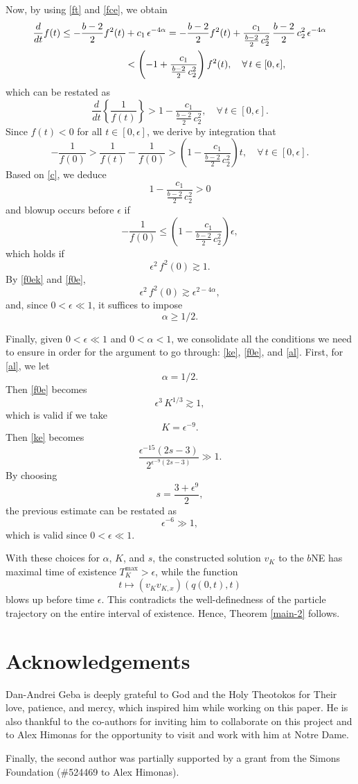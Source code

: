 \documentclass{amsart}
\begin{document}
Now, by using \eqref{ft} and \eqref{fce}, we obtain
\begin{equation*}
\aligned
\frac{d}{dt}f(t)\leq -\frac{b-2}{2}f^2(t) &+c_1\,\epsilon^{-4\alpha}= -\frac{b-2}{2}f^2(t)+\frac{c_1}{\frac{b-2}{2}\,c_2^2} \,\frac{b-2}{2}\,c_2^2\,\epsilon^{-4\alpha}\\
&<\left(-1+\frac{c_1}{\frac{b-2}{2}\,c_2^2}\right) f^2(t), \quad \forall\,t\in [0,\epsilon],
\endaligned
\end{equation*}
which can be restated as
\[
\frac{d}{dt}\left\{\frac{1}{f(t)}\right\}>1-\frac{c_1}{\frac{b-2}{2}\,c_2^2}, \quad \forall\,t\in [0,\epsilon].
\]
Since $f(t)<0$ for all $t\in [0,\epsilon]$, we derive by integration that
\[
- \frac{1}{f(0)}>\frac{1}{f(t)}- \frac{1}{f(0)}>\left(1-\frac{c_1}{\frac{b-2}{2}\,c_2^2}\right)t, \quad \forall\,t\in [0,\epsilon].
\]
Based on \eqref{c}, we deduce
\[
1-\frac{c_1}{\frac{b-2}{2}\,c_2^2}>0
\]
and blowup occurs before $\epsilon$ if 
\[
- \frac{1}{f(0)}\leq \left(1-\frac{c_1}{\frac{b-2}{2}\,c_2^2}\right)\epsilon,
\]
which holds if 
\[
\epsilon^2\,f^2(0)\gtrsim 1.
\]
By \eqref{f0ek} and \eqref{f0e}, 
\[
\epsilon^2\,f^2(0)\gtrsim \epsilon^{2-4\alpha},
\]
and, since $0<\epsilon\ll 1$, it suffices to impose 
\begin{equation}
\boxed{\alpha\geq 1/2.}\label{al}
\end{equation} 


Finally, given $0<\epsilon\ll 1$ and $0<\alpha<1$, we consolidate all the conditions we need to ensure in order for the argument to go through: \eqref{ke}, \eqref{f0e}, and \eqref{al}. First, for \eqref{al}, we let 
\[
\alpha= 1/2.
\]
Then \eqref{f0e} becomes
\[
\epsilon^3\, K^{1/3}\gtrsim 1,
\]
which is valid if we take
\[
K=\epsilon^{-9}.
\]
Then \eqref{ke} becomes
\[
\frac{\epsilon^{-15}(2s-3)}{2^{\epsilon^{-9}(2s-3)}}\gg 1.
\]
By choosing 
\[
s=\frac{3+\epsilon^9}{2},
\]
the previous estimate can be restated as
\[
\epsilon^{-6}\gg 1,
\]
which is valid since $0<\epsilon\ll 1$.

With these choices for $\alpha$, $K$, and $s$, the constructed solution $v_K$ to the $b$NE has maximal time of existence $T^{\text{max}}_K>\epsilon$, while the function 
\[
t\mapsto (v_K v_{K,x})(q(0,t), t)
\]
blows up before time $\epsilon$. This contradicts the well-definedness of the particle trajectory on the entire interval of existence. Hence, Theorem \ref{main-2} follows.


\section*{Acknowledgements}
Dan-Andrei Geba is deeply grateful to God and the Holy Theotokos for Their love, patience, and mercy, which inspired him while working on this paper. He is also thankful to the co-authors for inviting him to collaborate on this project and to Alex Himonas for the opportunity to visit and work with him at Notre Dame. 

Finally, the second author was partially supported by a grant from the 
Simons Foundation (\#524469 to Alex Himonas).  




\end{document}
